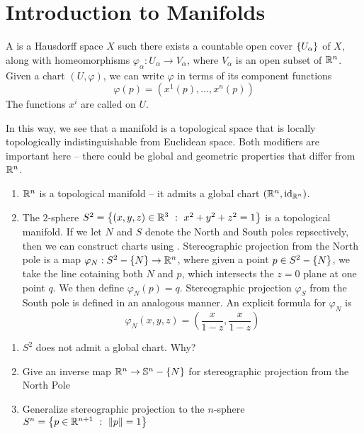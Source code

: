 %
\section{Introduction to Manifolds}
%
\begin{defn}
A  is a Hausdorff space $X$ such there exists a countable open cover $\left\lbrace U_\alpha \right\rbrace$
of $X$, along with homeomorphisms $\varphi_\alpha : U_\alpha \to V_\alpha$, where $V_\alpha$ is an open subset
of $\mathbb{R}^n$. Given a chart $(U, \varphi)$, we can write $\varphi$ in terms of its component functions
$$\varphi(p) = (x^1(p), \ldots, x^n(p)) $$
The functions $x^i$ are called  on $U$.
\end{defn}
%
In this way, we see that a manifold is a topological space that is locally topologically indistinguishable from
Euclidean space. Both modifiers are important here -- there could be global and geometric properties that
differ from $\mathbb{R}^n$.
%
\begin{exmp}\enumbreak
	\begin{enumerate}
		\item $\mathbb{R}^n$ is a topological manifold -- it admits a global chart $(\mathbb{R}^n, \operatorname{id}_{\mathbb{R}^n})$.
		\item The $2$-sphere $S^2 = \left\lbrace (x,y,z) \in \mathbb{R}^3 ~:~ x^2 + y^2 + z^2 = 1 \right\rbrace$ is a topological
		manifold. If we let $N$ and $S$ denote the North and South poles repsectively, then we can
		construct charts using . Stereographic projection from the North
		pole is a map $\varphi_N : S^2 - \left\lbrace N \right\rbrace \to \mathbb{R}^n$, where given a point $p \in S^2 - \left\lbrace N \right\rbrace$,
		we take the line cotaining both $N$ and $p$, which intersects the $z = 0 $ plane at one point
		$q$. We then define $\varphi_N(p) = q$. Stereographic projection $\varphi_S$ from the South
		pole is defined in an analogous manner. An explicit formula for $\varphi_N$ is
		$$\varphi_N(x,y,z) = \left(\frac{x}{1 - z}, \frac{x}{1 - z} \right) $$
	\end{enumerate}
\end{exmp}
%
\begin{exer}\enumbreak
	\begin{enumerate}
		\item $S^2$ does not admit a global chart. Why?
		\item Give an inverse map $\mathbb{R}^n \to \mathbb{S}^n - \left\lbrace N \right\rbrace$ for stereographic projection from the
			North Pole
		\item Generalize stereographic projection to the $n$-sphere
		$S^n = \left\lbrace p \in \mathbb{R}^{n+1} ~:~ \left\lVert p\right\rVert = 1 \right\rbrace$
	\end{enumerate}
\end{exer}
